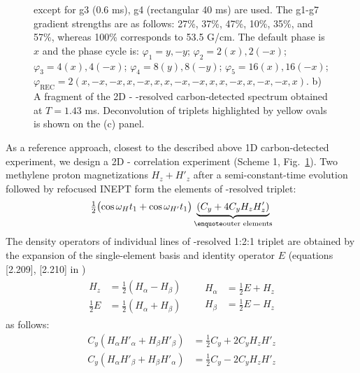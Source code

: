 \documentclass[twocolumn]{svjour3}           %
\begin{document}
\begin{figure}
{ except for g3 (0.6 ms), g4 (rectangular 40 ms) are used. 
 The g1-g7 gradient strengths are as follows: 27\%, 37\%, 47\%, 10\%, 35\%, and 57\%, whereas 100\% corresponds to 53.5 G/cm.
 The default phase is $x$ and the phase cycle is: 
 $\varphi_1 = y, -y$; 
 $\varphi_2 = 2(x), 2(-x)$; 
 $\varphi_3 = 4(x), 4(-x)$; 
 $\varphi_4 = 8(y), 8(-y)$; 
 $\varphi_5 = 16(x), 16(-x)$; 
 $\varphi_\text{REC} = 2(x, -x, -x, x, -x, x, x, -x, -x, x, x, -x, x, -x, -x, x)$. 
 b) A fragment of the 2D \hlab-\clab{} \oneJch-resolved carbon-detected 
 spectrum obtained at $T = 1.43$ ms. 
 Deconvolution of triplets highlighted  by yellow ovals is shown on 
 the (c) panel.
 }
 \label{fig:scheme1}
\end{figure}

As a reference approach, closest to the described above 1D carbon-detected 
experiment, we design a 2D \hlab-\clab{} correlation experiment
(Scheme 1, Fig.~\ref{fig:scheme1}). Two methylene proton magnetizations $H_z+H'_z$ after a semi-constant-time \hlab{} evolution followed by refocused {INEPT} form the \qouter{} elements of \oneJch-resolved triplet:
\begin{align}
  \label{eq:sch1:afterinept}
  \tfrac{1}{2}\bigl(\cos \omega_H t_1+\cos \omega_{H'} t_1\bigr) 
   \underbrace{(C_y+4 C_y H_z H'_z)}_\text{{\qouter} elements}
\end{align}
The density operators of individual lines of 
\oneJch-resolved 1:2:1 \clab{} tri\-plet 
are obtained by the expansion of the single-element basis
and identity operator $E$ (equations [2.209], [2.210] 
in \cite{cavanagh_protein_2007})
\begin{align}
  \begin{aligned}
    H_z & = \tfrac{1}{2}(H_\alpha-H_\beta) \\
    \tfrac{1}{2}E &= \tfrac{1}{2}(H_\alpha+H_\beta) 
  \end{aligned}
  &&
  \begin{aligned}
     H_\alpha & = \tfrac{1}{2}E+H_z \\
     H_\beta & = \tfrac{1}{2}E-H_z
\end{aligned}
\end{align}
as follows:
\begin{subequations}
\label{eq:sigmainout}
\begin{align}
  \label{eq:sigmaouter}
  C_y (H_\alpha H'_\alpha + H_\beta H'_\beta) & = \tfrac{1}{2}C_y+2C_y H_z H'_z \\
  \label{eq:sigmainner}
  C_y (H_\alpha H'_\beta + H_\beta H'_\alpha) & = \tfrac{1}{2}C_y-2C_y H_z H'_z
\end{align}
\end{subequations}
\end{document}
